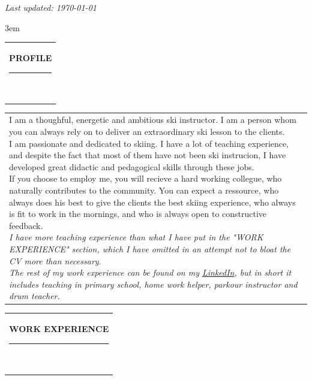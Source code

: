 \documentclass[10pt,A4]{article}
\newcommand{\mpwidth}{\linewidth-\fboxsep-\fboxsep}
\newcommand{\cvtext}[1] {
	\begin{tabular*}{1\mpwidth}{p{1\mpwidth}}
		\parbox{1\mpwidth}{#1}
	\end{tabular*}
}
\newcommand{\cvsection}[1] {
	\vspace{14pt}
	\cvtext{
		\textbf{\huge{\textcolor{darkcol}{\uppercase{#1}}}}\\[-4pt]
		\textcolor{maincol}{ \rule{0.1\textwidth}{2pt} } \\
	}
}
\begin{document}
\begin{paracol}{2}
\begin{rightcolumn}
\textit{Last updated: \today}

\vfill\null
\emergencystretch 3em
\cvsection{PROFILE}
\cvtext{I am a thoughful, energetic and ambitious ski instructor. 
I am a person whom you can always rely on to deliver an extraordinary ski lesson to the clients.\\

I am passionate and dedicated to skiing. 
I have a lot of teaching experience, and despite the fact that most of them have not been ski instrucion,
I have developed great didactic and pedagogical skills through these jobs.\\

If you choose to employ me, you will recieve a hard working collegue,
who naturally contributes to the community. You can expect a ressource,
who always does his best to give the clients the best skiing experience,
who always is fit to work in the mornings,
and who is always open to constructive feedback.\\

\textit{I have more teaching experience than what I have put in the "WORK EXPERIENCE" section, which I have omitted in an attempt not to bloat the CV more than necessary.\\
The rest of my work experience can be found on my \href{https://www.linkedin.com/in/lasse-skaalum/}{LinkedIn}, but in short it includes teaching in primary school, home work helper, parkour instructor and drum teacher.}
}

\vfill\null
\cvsection{WORK EXPERIENCE}


\end{rightcolumn}
\end{paracol}
\end{document}

